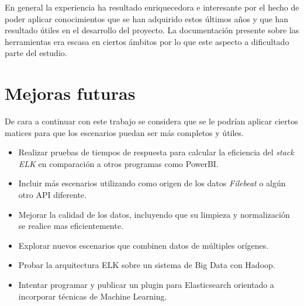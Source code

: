 En general la experiencia ha resultado enriquecedora e interesante por el hecho de poder aplicar conocimientos que se han adquirido estos últimos años y que han resultado útiles en el desarrollo del proyecto. La documentación presente sobre las herramientas era escasa en ciertos ámbitos por lo que este aspecto a dificultado parte del estudio.

\section{Mejoras futuras}
De cara a continuar con este trabajo se considera que se le podrían aplicar ciertos matices para que los escenarios puedan ser más completos y útiles.
\begin{itemize}
    \item Realizar pruebas de tiempos de respuesta para calcular la eficiencia del \textit{stack ELK} en comparación a otros programas como PowerBI.
    \item Incluir más escenarios utilizando como origen de los datos \textit{Filebeat} o algún otro API diferente.
    \item Mejorar la calidad de los datos, incluyendo que su limpieza y normalización se realice mas eficientemente.
\item Explorar nuevos escenarios que combinen datos de múltiples orígenes.
\item Probar la arquitectura ELK sobre un sistema de Big Data con Hadoop.
\item Intentar programar y publicar un plugin para Elasticsearch orientado a incorporar técnicas de Machine Learning. 
\end{itemize}